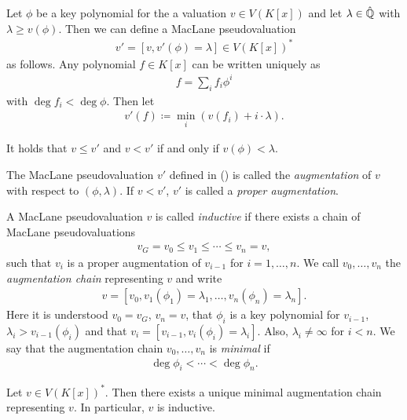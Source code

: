 Let $\phi$ be a key polynomial for the a valuation $v \in V(K[x])$ and let $\lambda \in \hat{\mathbb Q}$ with $\lambda \geq v(\phi)$.
Then we can define a MacLane pseudovaluation 
\begin{align} \label{eq:def-augmentation}
    v' = [v, v'(\phi) = \lambda] \in V(K[x])^*
\end{align}
as follows.
Any polynomial $f \in K[x]$ can be written uniquely as 
\begin{align}
    f = \sum_i f_i \phi^i
\end{align}
with $\deg f_i < \deg \phi$. Then let 
\begin{align}
    v'(f) \coloneqq \min_i(v(f_i) + i\cdot \lambda).
\end{align}

It holds that $v\leq v'$ and $v < v'$ if and only if $v(\phi) < \lambda$.

\begin{definition}
    The MacLane pseudovaluation $v'$ defined in () is called the \textit{augmentation} of $v$ with respect to $(\phi,\lambda)$.
    If $v < v'$, $v'$ is called a \textit{proper augmentation}.
\end{definition}

\begin{definition}
    A MacLane pseudovaluation $v$ is called \textit{inductive} if there exists a chain of MacLane pseudovaluations
    \begin{align}
        v_{\scriptscriptstyle G} = v_0 \leq v_1 \leq \cdots \leq v_n = v,
    \end{align}
    such that $v_i$ is a proper augmentation of $v_{i-1}$ for $i=1,\dots, n$.
    We call $v_0,\dots,v_n$ the \textit{augmentation chain} representing $v$ and write \begin{align}
        v = [v_0,v_1(\phi_1) = \lambda_1,\dots, v_n(\phi_n) = \lambda_n].
    \end{align}
    Here it is understood $v_0 = v_{\scriptscriptstyle G}$, $v_n = v$, that $\phi_i$ is a key polynomial for $v_{i-1}$, $\lambda_i > v_{i-1}(\phi_i)$
    and that $v_i = [v_{i-1}, v_i(\phi_i) = \lambda_i]$. 
    Also, $\lambda_i \neq \infty$ for $i < n$.
    We say that the augmentation chain $v_0,\dots,v_n$ is \textit{minimal} if
    \begin{align}
        \deg \phi_i < \cdots < \deg \phi_n.
    \end{align}
\end{definition}

\begin{theorem}
    Let $v \in V(K[x])^*$.
    Then there exists a unique minimal augmentation chain representing $v$.
    In particular, $v$ is inductive.
\end{theorem}


